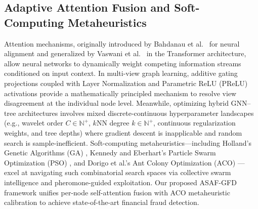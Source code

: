 \documentclass[10pt,a4paper,twocolumn]{article}
\begin{document}
\subsection{Adaptive Attention Fusion and Soft-Computing Metaheuristics}

Attention mechanisms, originally introduced by Bahdanau et al.\ \cite{ref53} for neural alignment and generalized by Vaswani et al.\ \cite{ref54} in the Transformer architecture, allow neural networks to dynamically weight competing information streams conditioned on input context. In multi-view graph learning, additive gating projections coupled with Layer Normalization \cite{ref55} and Parametric ReLU (PReLU) activations \cite{ref56} provide a mathematically principled mechanism to resolve view disagreement at the individual node level. Meanwhile, optimizing hybrid GNN--tree architectures involves mixed discrete-continuous hyperparameter landscapes (e.g., wavelet order $C \in \mathbb{N}^+$, $k$NN degree $k \in \mathbb{N}^+$, continuous regularization weights, and tree depths) where gradient descent is inapplicable and random search is sample-inefficient. Soft-computing metaheuristics---including Holland's Genetic Algorithms (GA) \cite{ref59}, Kennedy and Eberhart's Particle Swarm Optimization (PSO) \cite{ref58}, and Dorigo et al.'s Ant Colony Optimization (ACO) \cite{ref57}---excel at navigating such combinatorial search spaces via collective swarm intelligence and pheromone-guided exploitation. Our proposed ASAF-GFD framework unifies per-node self-attention fusion with ACO metaheuristic calibration to achieve state-of-the-art financial fraud detection.
\end{document}
